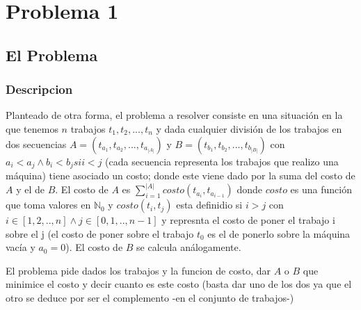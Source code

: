 \documentclass[A4paper,oneside,fleqn,11pt]{article}
\theoremstyle{definition}
\newcommand{\NN}{\mathbb{N}}
\begin{document}
 



\tableofcontents
\clearpage

\section{Problema 1}
\subsection{El Problema}

\subsubsection{Descripcion}
Planteado de otra forma, el problema a resolver consiste en una situación en la que tenemos $n$ trabajos $t_{1},t_{2},...,t_{n}$ y dada cualquier división de los trabajos en dos secuencias $A=(t_{a_{1}},t_{a_{2}},..., t_{a_{|A|}})$ y $B=(t_{b_{1}}, t_{b_{2}},...,t_{b_{|B|}})$  con $a_{i}<a_{j} \land b_{i}<b_{j} si i<j$ (cada secuencia representa los trabajos que realizo una máquina) tiene asociado un costo; donde este viene dado por la suma del costo de $A$ y el de $B$. El costo de $A$ es  $\sum_{i=1}^{|A|} costo (t_{a_{i}},t_{a_{i-1}})$  donde $costo$ es una función que toma valores en $\NN_{0}$ y $costo(t_{i},t_{j})$ esta definidio si $i>j$ con $i \in [1,2,..,n] \land j \in [0,1,..,n-1]$ y represnta el costo de poner el trabajo i sobre el j (el costo de poner sobre el trabajo $t_{0}$ es el de ponerlo sobre la máquina vacía y $a_{0}=0$). El costo de $B$ se calcula análogamente. 

El problema pide dados los trabajos y la funcion de costo, dar $A$ o $B$ que minimice el costo y decir cuanto es este costo (basta dar uno de los dos ya que el otro se deduce por ser el complemento -en el conjunto de trabajos-)
\end{document}
